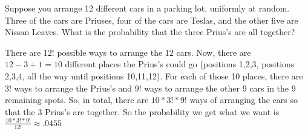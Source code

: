 \question Suppose you arrange 12 different cars in a parking lot, 
uniformly at random. Three of the cars are Priuses, four of the cars 
are Teslas, and the other five are Nissan Leaves. What is the 
probability that the three Prius's are all together? 

\begin{solution}
There are $12!$ possible ways to arrange the 12 cars. Now, there are 
$12 - 3+ 1 = 10$ different places the Prius’s could go (positions 
1,2,3, positions 2,3,4, all the way until positions 10,11,12). 
For each of those 10 places, there are 3! ways to arrange the Prius’s 
and 9! ways to arrange the other 9 cars in the 9 remaining spots. 
So, in total, there are $10*3!*9!$ ways of arranging the cars so that 
the 3 Prius’s are together. So the probability we get what we want is 
$\frac{10*3!*9!}{12! } ≈ .0455$
 \end{solution}